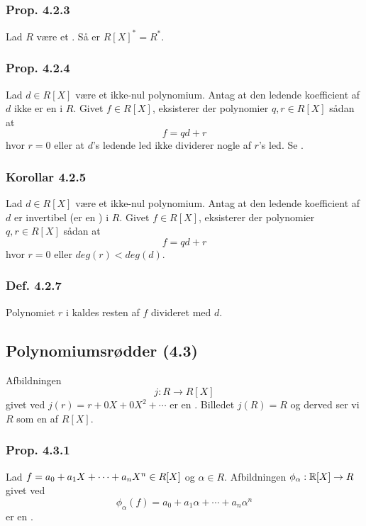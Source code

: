 \subsubsection{Prop. 4.2.3}
\label{Prop. 4.2.3}
Lad $R$ være et . Så er $R[X]^* = R^*$.

\subsubsection{Prop. 4.2.4}
\label{Prop. 4.2.4}
Lad $d \in R[X]$ være et ikke-nul polynomium. Antag at den ledende koefficient
af $d$ ikke er en  i $R$. Givet $f \in R[X]$, eksisterer der
polynomier $q,r \in R[X]$ sådan at
\begin{equation*}
  f = qd + r
\end{equation*}
hvor $r = 0$ eller at $d$'s ledende led ikke dividerer nogle af $r$'s led. Se
.

\subsubsection{Korollar 4.2.5}
\label{Korollar 4.2.5}
Lad $d \in R[X]$ være et ikke-nul polynomium. Antag at den ledende koefficient
af $d$ er invertibel (er en ) i $R$. Givet $f \in R[X]$,
eksisterer der polynomier $q,r \in R[X]$ sådan at
\begin{equation*}
  f = qd + r
\end{equation*}
hvor $r = 0$ eller $deg(r) < deg(d)$.

\subsubsection{Def. 4.2.7}
\label{Def. 4.2.7}
Polynomiet $r$ i  kaldes resten af $f$ divideret med
$d$.


\subsection{Polynomiumsrødder (4.3)}
\label{Polynomiumsroedder (4.3)}
Afbildningen
\begin{equation*}
  j: R \rightarrow R[X]
\end{equation*}
givet ved $j(r) = r + 0X + 0X^2 + \cdots$ er en 
. Billedet $j(R) = R$ og derved ser vi $R$ som en
 af $R[X]$.

\subsubsection{Prop. 4.3.1}
\label{Prop. 4.3.1}
Lad $f = a_0 + a_1 X + \cdots + a_n X^n \in R[X]$ og $\alpha \in R$. Afbildningen
$\phi_\alpha: \mathbb{R}[X] \rightarrow R$ givet ved
\begin{equation*}
  \phi_\alpha(f) = a_0 + a_1 \alpha + \cdots + a_n \alpha^n 
\end{equation*}
er en .

